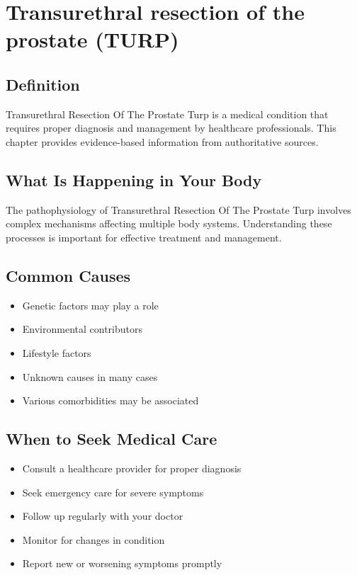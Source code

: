 
\chapter{Transurethral resection of the prostate (TURP)}

\section*{Definition}
Transurethral Resection Of The Prostate Turp is a medical condition that requires proper diagnosis and management by healthcare professionals. This chapter provides evidence-based information from authoritative sources.

\section*{What Is Happening in Your Body}
The pathophysiology of Transurethral Resection Of The Prostate Turp involves complex mechanisms affecting multiple body systems. Understanding these processes is important for effective treatment and management.

\section*{Common Causes}
\begin{itemize}
  \item Genetic factors may play a role
  \item Environmental contributors
  \item Lifestyle factors
  \item Unknown causes in many cases
  \item Various comorbidities may be associated
\end{itemize}

\section*{When to Seek Medical Care}
\begin{itemize}
  \item Consult a healthcare provider for proper diagnosis
  \item Seek emergency care for severe symptoms
  \item Follow up regularly with your doctor
  \item Monitor for changes in condition
  \item Report new or worsening symptoms promptly
\end{itemize}

